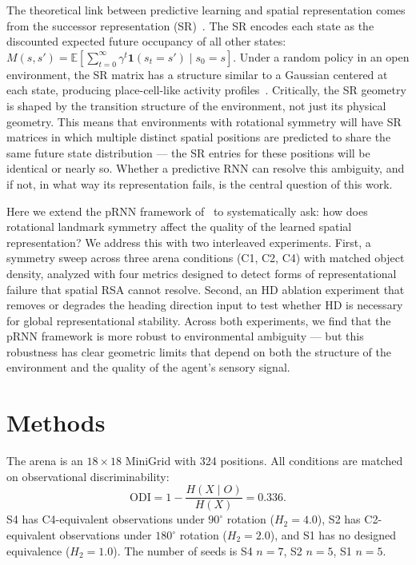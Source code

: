 \documentclass[11pt, a4paper]{article}
\begin{document}
The theoretical link between predictive learning and spatial representation
comes from the successor representation (SR)~\citep{stachenfeld2017}. The
SR encodes each state as the discounted expected future occupancy of all
other states: $M(s,s') = \mathbb{E}\left[\sum_{t=0}^{\infty} \gamma^t
\mathbf{1}(s_t = s') \mid s_0 = s\right]$. Under a random policy in an
open environment, the SR matrix has a structure similar to a Gaussian
centered at each state, producing place-cell-like activity
profiles~\citep{stachenfeld2017}. Critically, the SR geometry is shaped
by the transition structure of the environment, not just its physical
geometry. This means that environments with rotational symmetry will have
SR matrices in which multiple distinct spatial positions are predicted to
share the same future state distribution --- the SR entries for these
positions will be identical or nearly so. Whether a predictive RNN can
resolve this ambiguity, and if not, in what way its representation fails,
is the central question of this work.

Here we extend the pRNN framework of~\citet{levenstein2024} to
systematically ask: how does rotational landmark symmetry affect the
quality of the learned spatial representation? We address
this with two interleaved experiments. First, a symmetry sweep across
three arena conditions (C1, C2, C4) with matched object density, analyzed
with four metrics designed to detect forms of representational failure that
spatial RSA cannot resolve. Second, an HD ablation experiment that removes
or degrades the heading direction input to test whether HD is necessary for
global representational stability. Across both experiments, we find that the pRNN framework is more robust to environmental ambiguity --- but this robustness has clear geometric limits that depend on both the structure of the environment and the quality of the agent's sensory signal.



\section*{Methods}

The arena is an $18 \times 18$ MiniGrid with 324 positions. All conditions are matched on observational discriminability:
\[
\mathrm{ODI}=1-\frac{H(X\mid O)}{H(X)}=0.336.
\]
S4 has C4-equivalent observations under $90^{\circ}$ rotation ($H_2=4.0$), S2 has C2-equivalent observations under $180^{\circ}$ rotation ($H_2=2.0$), and S1 has no designed equivalence ($H_2=1.0$). The number of seeds is S4 $n=7$, S2 $n=5$, S1 $n=5$.
\end{document}
